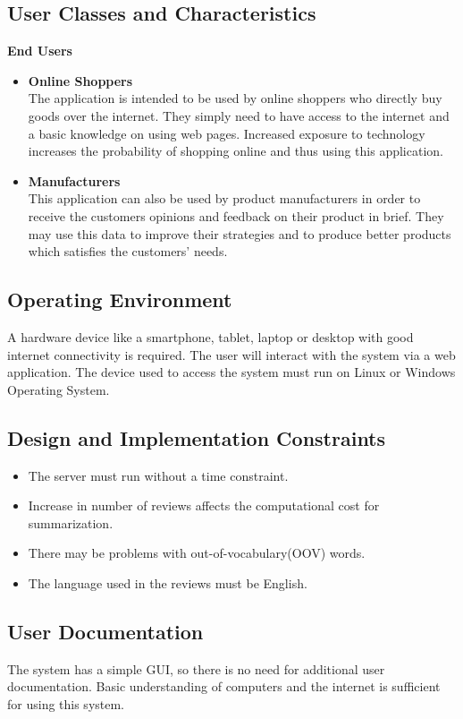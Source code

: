 \documentclass[11pt]{report}
\begin{document}
\subsection{User Classes and Characteristics }
\textbf{End Users}

\begin{itemize}
\item \textbf{Online Shoppers} \\
The application is intended to be used by online shoppers who directly buy goods over the internet. They simply need to have access to the internet and a basic knowledge on using web pages. Increased exposure to technology increases the probability of shopping online and thus using this application.
\item \textbf{Manufacturers} \\
This application can also be used by product manufacturers in order to receive the customers opinions and feedback on their product in brief. They may use this data to improve their strategies and to produce better products which satisfies the customers' needs.
\end{itemize}

\subsection{Operating Environment}
A hardware device like a smartphone, tablet, laptop or desktop with good internet connectivity is required. The user will interact with the system via a web application. The device used to access the system must run on Linux or Windows Operating System.

\subsection{Design and Implementation Constraints}
\begin{itemize}
\item The server must run without a time constraint.
\item Increase in number of reviews affects the computational cost for summarization. 
\item There may be problems with out-of-vocabulary(OOV) words.
\item The language used in the reviews must be English.
\end{itemize}

\subsection{User Documentation}
The system has a simple GUI, so there is no need for additional user documentation. Basic understanding of computers and the internet is sufficient for using this system. 
\end{document}
